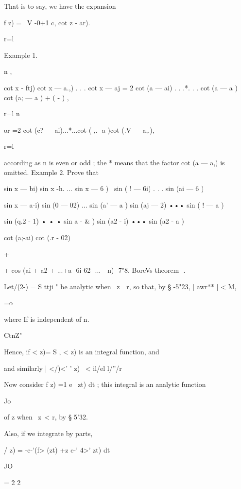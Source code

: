 {That is to say, we have the expansion 

f z) = \  V -0+1 c, cot  z - ar). 

  r=l 

Example 1. 

n , 

cot  x - ftj) cot  x — a.,) . . . cot  x — aj = 2 cot (a  — ai) . . .*. . . cot (a  — a ) cot (a; — a ) + ( - )  , 

r=l 
n 

or =2 cot (c?  — ai)...*...cot ( ,. -a )cot (.V — a,.), 

r=l 

according as n is even or odd ; the * means that the factor cot (a  — a,) is omitted. 
Example 2. Prove that 

sin  x — bi) sin  x -h.  ... sin  x — 6 ) \  sin ( ! — 6i) . . . sin (ai — 6 ) 



sin  x — a-i) sin (0  — 02) ... sin (a' — a ) sin (aj —  2) ••• sin ( ! — a ) 

sin (q.2 -  1) • • • sin  a  - \& ) 
sin (a2 -  i) ••• sin (a2 - a ) 



cot (a;-ai) 
cot (.r - 02) 



+ 



+ cos (ai + a2 + ...+a -6i-62- ... - n)- 
7"8. BoreVs theorem- . 

Let/(2-) = S ttji " be analytic when \ z\ \  r, so that, by § -5"23, | awr** | < M, 

 =o 

where If is independent of n. 



CtnZ" 



Hence, if <  z)= S   , <  z) is an integral function, and 

and similarly | </)<' '  z) \ < il/el l/''/r  

Now consider f   z) =1 e~   zt) dt ; this integral is an analytic function 

Jo 

of z when \ z\ < r, by § 5'32. 

Also, if we integrate by parts, 

/  z) = -e-'(f> (zt) +z e-' 4>'  zt) dt 

JO 



= 2 2 

}
